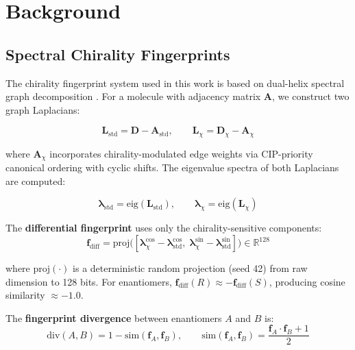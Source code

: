 \documentclass[11pt,a4paper]{article}
\begin{document}
\section{Background}

\subsection{Spectral Chirality Fingerprints}

The chirality fingerprint system used in this work is based on dual-helix
spectral graph decomposition \cite{knopp2026zynerji}. For a molecule with
adjacency matrix $\mathbf{A}$, we construct two graph Laplacians:

\begin{equation}
    \mathbf{L}_{\text{std}} = \mathbf{D} - \mathbf{A}_{\text{std}}, \qquad
    \mathbf{L}_{\chi} = \mathbf{D}_\chi - \mathbf{A}_\chi
\end{equation}

\noindent where $\mathbf{A}_\chi$ incorporates chirality-modulated edge
weights via CIP-priority canonical ordering with cyclic shifts. The
eigenvalue spectra of both Laplacians are computed:

\begin{equation}
    \boldsymbol{\lambda}_{\text{std}} = \text{eig}(\mathbf{L}_{\text{std}}), \qquad
    \boldsymbol{\lambda}_\chi = \text{eig}(\mathbf{L}_\chi)
\end{equation}

The \textbf{differential fingerprint} uses only the chirality-sensitive
components:
\begin{equation}
    \mathbf{f}_{\text{diff}} = \text{proj}\big(
        [\boldsymbol{\lambda}_\chi^{\cos} - \boldsymbol{\lambda}_{\text{std}}^{\cos},\;
         \boldsymbol{\lambda}_\chi^{\sin} - \boldsymbol{\lambda}_{\text{std}}^{\sin}]
    \big) \in \mathbb{R}^{128}
\end{equation}

\noindent where $\text{proj}(\cdot)$ is a deterministic random projection
(seed 42) from raw dimension to 128 bits. For enantiomers,
$\mathbf{f}_{\text{diff}}(R) \approx -\mathbf{f}_{\text{diff}}(S)$, producing
cosine similarity $\approx -1.0$.

The \textbf{fingerprint divergence} between enantiomers $A$ and $B$ is:
\begin{equation}
    \text{div}(A, B) = 1 - \text{sim}(\mathbf{f}_A, \mathbf{f}_B), \qquad
    \text{sim}(\mathbf{f}_A, \mathbf{f}_B) = \frac{\mathbf{f}_A \cdot \mathbf{f}_B + 1}{2}
\end{equation}
\end{document}

